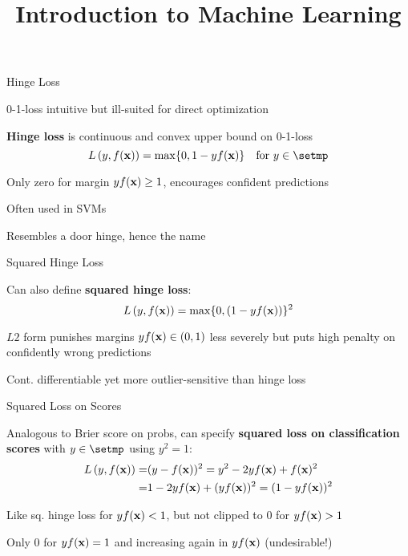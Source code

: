 \documentclass[11pt,compress,t,notes=noshow, xcolor=table]{beamer}
\title{Introduction to Machine Learning}
\begin{document}
    

\begin{framei}[sep=M]{Hinge Loss}

\item 0-1-loss intuitive but ill-suited for direct optimization
\item \textbf{Hinge loss} is continuous and convex 
upper bound on 0-1-loss 
$$\Lxy = \max \{ 0, 1 - \yf \} \quad \text{for} \ y \in \setmp$$
\item Only zero for margin $y f(\mathbf{x})\geq 1$, 
encourages confident predictions
\item Often used in SVMs
\item Resembles a door hinge, hence the name


\end{framei}


\begin{framei}[sep=M]{Squared Hinge Loss}

\item Can also define \textbf{squared hinge loss}:
$$L\left(y, f(\mathbf{x})\right) = \max \{ 0, (1 - y f(\mathbf{x}))\}^2$$
\item $L2$ form punishes margins $y f(\mathbf{x}) \in (0, 1)$ less severely but puts high penalty on confidently wrong predictions
\item Cont. differentiable yet more outlier-sensitive than hinge loss



\end{framei}


\begin{framei}[sep=M]{Squared Loss on Scores}


\item Analogous to Brier score on probs, can specify \textbf{squared loss on classification scores} with $y \in \setmp$ using $y^2=1$:
\begin{align*}
L\left(y, f(\mathbf{x})\right) =&(y - f(\mathbf{x}))^2 = y^2 - 2y f(\mathbf{x}) + f(\mathbf{x})^2\\
=&1 - 2y f(\mathbf{x}) + (y f(\mathbf{x}))^2 = (1 - y f(\mathbf{x}))^2
\end{align*}
\item Like sq. hinge loss for $y f(\mathbf{x}) < 1$, but not clipped to $0$ for $y f(\mathbf{x})>1$
\item Only 0 for $y f(\mathbf{x}) = 1$ and increasing again in $y f(\mathbf{x})$ (undesirable!)



\end{framei}
\end{document}
